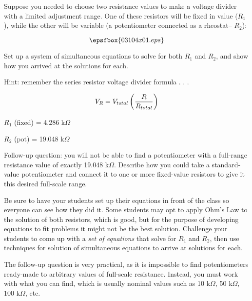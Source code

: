

Suppose you needed to choose two resistance values to make a voltage divider with a limited adjustment range.  One of these resistors will be fixed in value ($R_1$), while the other will be variable (a potentiometer connected as a rheostat-- $R_2$):

$$\epsfbox{03104x01.eps}$$

Set up a system of simultaneous equations to solve for both $R_1$ and $R_2$, and show how you arrived at the solutions for each.

\vskip 10pt

Hint: remember the series resistor voltage divider formula . . .

$$V_R = V_{total}\left( {R \over R_{total}} \right)$$







$R_1$ (fixed) = 4.286 k$\Omega$

\vskip 10pt

$R_2$ (pot) = 19.048 k$\Omega$

\vskip 10pt

Follow-up question: you will not be able to find a potentiometer with a full-range resistance value of exactly 19.048 k$\Omega$.  Describe how you could take a standard-value potentiometer and connect it to one or more fixed-value resistors to give it this desired full-scale range.







Be sure to have your students set up their equations in front of the class so everyone can see how they did it.  Some students may opt to apply Ohm's Law to the solution of both resistors, which is good, but for the purpose of developing equations to fit problems it might not be the best solution.  Challenge your students to come up with a {\it set of equations} that solve for $R_1$ and $R_2$, then use techniques for solution of simultaneous equations to arrive at solutions for each.

The follow-up question is very practical, as it is impossible to find potentiometers ready-made to arbitrary values of full-scale resistance.  Instead, you must work with what you can find, which is usually nominal values such as 10 k$\Omega$, 50 k$\Omega$, 100 k$\Omega$, etc.




